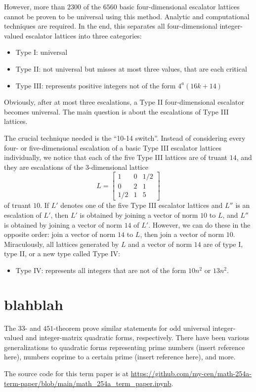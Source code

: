 \documentclass{article}
\begin{document}
However, more than $2300$ of the $6560$ basic four-dimensional escalator lattices cannot be proven to be universal using this method.
Analytic and computational techniques are required.
In the end, this separates all four-dimensional integer-valued escalator lattices into three categories:
\begin{itemize}
    \item Type I: universal
    \item Type II: not universal but misses at most three values, that are each critical
    \item Type III: represents positive integers not of the form $4^a(16k+14)$
\end{itemize}
Obviously, after at most three escalations, a Type II four-dimensional escalator becomes universal.
The main question is about the escalations of Type III lattices.

The crucial technique needed is the ``10-14 switch''.
Instead of considering every four- or five-dimensional escalation of a basic Type III escalator lattices individually, we notice that each of the five Type III lattices are of truant $14$, and they are escalations of the $3$-dimensional lattice
\[L = \begin{bmatrix} 1 & 0 & 1/2 \\ 0 & 2 & 1 \\ 1/2 & 1 & 5 \end{bmatrix}\]
of truant $10$.
If $L'$ denotes one of the five Type III escalator lattices and $L''$ is an escalation of $L'$, then $L'$ is obtained by joining a vector of norm $10$ to $L$, and $L''$ is obtained by joining a vector of norm $14$ of $L'$.
However, we can do these in the opposite order: join a vector of norm $14$ to $L$, then join a vector of norm $10$.
Miraculously, all lattices generated by $L$ and a vector of norm $14$ are of type I, type II, or a new type called Type IV:
\begin{itemize}
    \item Type IV: represents all integers that are not of the form $10n^2$ or $13n^2$.
\end{itemize}

\section{blahblah}

The $33$- and $451$-theorem prove similar statements for odd universal integer-valued and integer-matrix quadratic forms, respectively. There have been various generalizations to quadratic forms representing prime numbers (insert reference here), numbers coprime to a certain prime (insert reference here), and more.

The source code for this term paper is at \url{https://github.com/my-cen/math-254a-term-paper/blob/main/math_254a_term_paper.ipynb}.

\printbibliography
\end{document}

